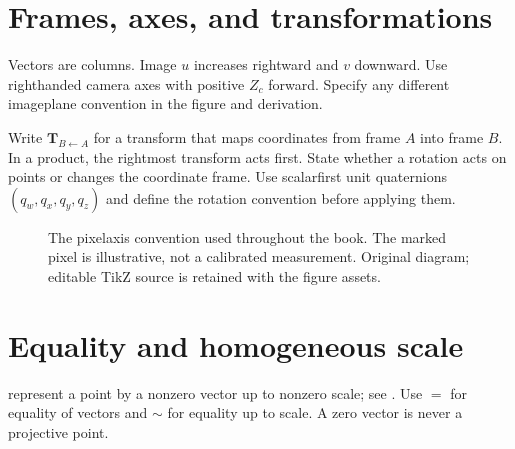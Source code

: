 \documentclass[letterpaper,11pt,english,openany,oneside]{jupyterBook}
\begin{document}
\section{Frames, axes, and transformations}
\label{\detokenize{foundations/notation:frames-axes-and-transformations}}
\sphinxAtStartPar
Vectors are columns. Image \(u\) increases rightward and \(v\) downward. Use right\sphinxhyphen{}handed camera axes with positive \(Z_c\) forward. Specify any different image\sphinxhyphen{}plane convention in the figure and derivation.

\sphinxAtStartPar
Write \(\mathbf{T}_{B\leftarrow A}\) for a transform that maps coordinates from frame \(A\) into frame \(B\). In a product, the rightmost transform acts first. State whether a rotation acts on points or changes the coordinate frame. Use scalar\sphinxhyphen{}first unit quaternions \((q_w,q_x,q_y,q_z)\) and define the rotation convention before applying them.

\begin{figure}[H]
\centering
\capstart

\noindent{}
\caption{The pixel\sphinxhyphen{}axis convention used throughout the book. The marked pixel is illustrative, not a calibrated measurement. Original diagram; editable TikZ source is retained with the figure assets.}\label{\detokenize{foundations/notation:fig-pixel-axes}}\end{figure}


\section{Equality and homogeneous scale}
\label{\detokenize{foundations/notation:equality-and-homogeneous-scale}}
\sphinxAtStartPar
{} represent a point by a nonzero vector up to nonzero scale; see {\hyperref[\detokenize{reference/glossary:term-Homogeneous-coordinates}]{}}. Use \(=\) for equality of vectors and \(\sim\) for equality up to scale. A zero vector is never a projective point.
\end{document}
